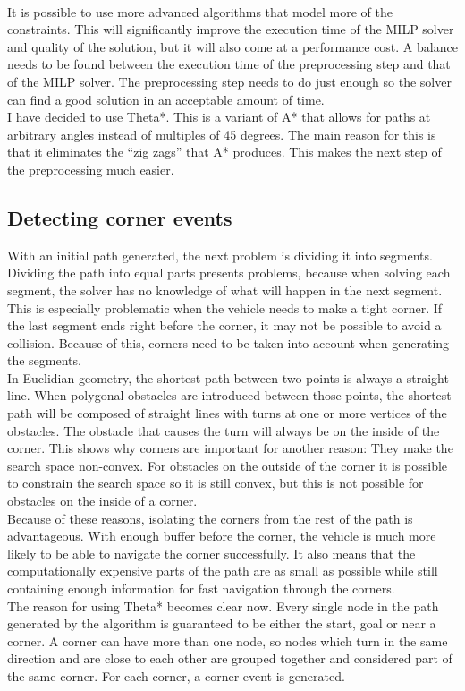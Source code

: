 \\
It is possible to use more advanced algorithms that model more of the constraints. This will significantly improve the execution time of the MILP solver and quality of the solution, but it will also come at a performance cost. A balance needs to be found between the execution time of the preprocessing step and that of the MILP solver. The preprocessing step needs to do just enough so the solver can find a good solution in an acceptable amount of time. 
\\
I have decided to use Theta*. This is a variant  of A* that allows for paths at arbitrary angles instead of multiples of 45 degrees. The main reason for this is that it eliminates the ``zig zags'' that A* produces. This makes the next step of the preprocessing much easier.\\
\subsection{Detecting corner events}
With an initial path generated, the next problem is dividing it into segments. Dividing the path into equal parts presents problems, because when solving each segment, the solver has no knowledge of what will happen in the next segment. This is especially problematic when the vehicle needs to make a tight corner. If the last segment ends right before the corner, it may not be possible to avoid a collision. Because of this, corners need to be taken into account when generating the segments.\\
In Euclidian geometry, the shortest path between two points is always a straight line. When polygonal obstacles are introduced between those points, the shortest path will be composed of straight lines with turns at one or more vertices of the obstacles. The obstacle that causes the turn will always be on the inside of the corner. This shows why corners are important for another reason: They make the search space non-convex. For obstacles on the outside of the corner it is possible to constrain the search space so it is still convex, but this is not possible for obstacles on the inside of a corner.\\
Because of these reasons, isolating the corners from the rest of the path is advantageous. With enough buffer before the corner, the vehicle is much more likely to be able to navigate the corner successfully. It also means that the computationally expensive parts of the path are as small as possible while still containing enough information for fast navigation through the corners.
\\
The reason for using Theta* becomes clear now. Every single node in the path generated by the algorithm is guaranteed to be either the start, goal or near a corner. A corner can have more than one node, so nodes which turn in the same direction and are close to each other are grouped together and considered part of the same corner. For each corner, a corner event is generated.

